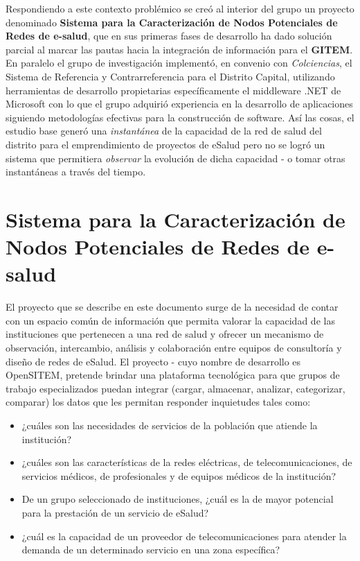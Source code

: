 Respondiendo a este contexto problémico se creó al interior del grupo un proyecto denominado \textbf{Sistema para la Caracterización de Nodos Potenciales de Redes de e-salud}, que en sus primeras fases de desarrollo ha dado solución parcial al marcar las pautas hacia la integración de información para el \textbf{GITEM}. En paralelo el grupo de investigación implementó, en convenio con \textit{Colciencias}, el Sistema de Referencia y Contrarreferencia para el Distrito Capital, utilizando herramientas de desarrollo propietarias específicamente el middleware .NET de Microsoft con lo que el grupo adquirió experiencia en la desarrollo de aplicaciones siguiendo metodologías efectivas para la construcción de software. Así las cosas, el estudio base generó una \textit{instantánea} de la capacidad de la red de salud del distrito para el emprendimiento de proyectos de eSalud pero no se logró un sistema que permitiera \textit{observar} la evolución de dicha capacidad - o tomar otras instantáneas a través del tiempo.

\section{Sistema para la Caracterización de Nodos Potenciales de Redes de e-salud}

El proyecto que se describe en este documento surge de la necesidad de contar con un espacio común de información que permita valorar la capacidad de las instituciones que pertenecen a una red de salud y ofrecer un mecanismo de observación, intercambio, análisis y colaboración entre equipos de consultoría y diseño de redes de eSalud. El proyecto - cuyo nombre de desarrollo es OpenSITEM, pretende brindar una plataforma tecnológica para que grupos de trabajo especializados puedan integrar (cargar, almacenar, analizar, categorizar, comparar) los datos que les permitan responder inquietudes tales como:

\begin{itemize}
 \item ¿cuáles son las necesidades de servicios de la población que atiende la institución?
 \item ¿cuáles son las características de la redes eléctricas, de telecomunicaciones, de servicios médicos, de profesionales y de equipos médicos de la institución?
 \item De un grupo seleccionado de instituciones, ¿cuál es la de mayor potencial para la prestación de un servicio de eSalud?
 \item ¿cuál es la capacidad de un proveedor de telecomunicaciones para atender la demanda de un determinado servicio en una zona específica?
\end{itemize}

